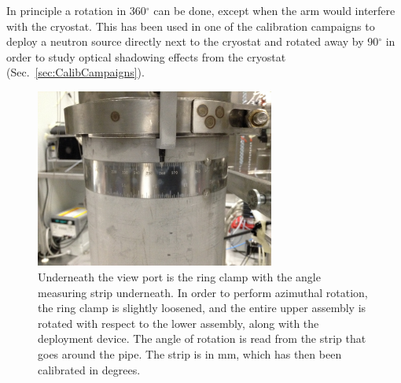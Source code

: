 In principle a rotation in 360$^\circ$ can be done, except when the arm would interfere with the cryostat. This has been used in one of the calibration campaigns to deploy a neutron source directly next to the cryostat and rotated away by 90$^\circ$ in order to study optical shadowing effects from the cryostat (Sec.~\ref{sec:CalibCampaigns}). 





\begin{figure}[htbp]
 \centering
  \includegraphics[width=0.7\textwidth]{Figures/RingClamp_WithPin_IMG_2669.JPG}
  \caption{Underneath the view port is the ring clamp with the angle measuring strip underneath. In order to perform azimuthal rotation, the ring clamp is slightly loosened, and the entire upper assembly is rotated with respect to the lower assembly, along with the deployment device. The angle of rotation is read from the strip that goes around the pipe. The strip is in mm, which has then been calibrated in degrees.}
  \label{fig:ring_clamp}
\end{figure} 

